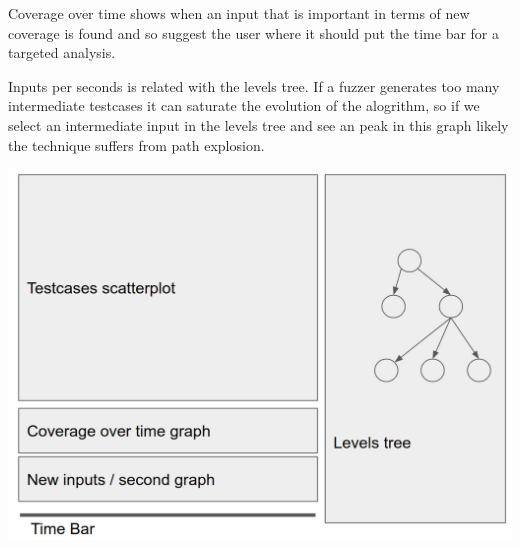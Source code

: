 \documentclass[conference,compsoc]{IEEEtran}
\begin{document}
Coverage over time shows when an input that is important in terms of new coverage is found and so suggest the user where it should put the time bar for a targeted analysis.

Inputs per seconds is related with the levels tree. If a fuzzer generates too many intermediate testcases it can saturate the evolution of the alogrithm, so if we select an intermediate input in the levels tree and see an peak in this graph likely the technique suffers from path explosion.

\begin{center}
\includegraphics[scale=0.2]{mockup}
\end{center}



\end{document}
